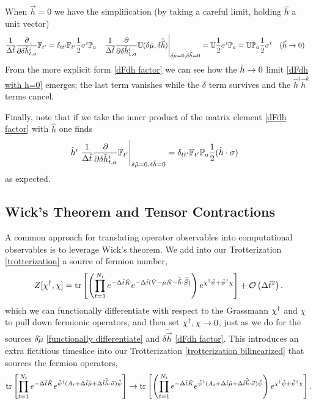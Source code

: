 When $\vec{h}=0$ we have the simplification (by taking a careful limit, holding $\hat{h}$ a unit vector)
\begin{align}
	\frac{1}{\Delta\tilde{t}} \frac{\partial}{\partial \delta\tilde{h}^i_{t,a}} \mathbb{F}_{t'} &= \delta_{tt'} \mathbb{F}_{t'} \frac{1}{2} \sigma^i \mathbb{P}_a
	&
	\left.\frac{1}{\Delta\tilde{t}} \frac{\partial}{\partial \delta\tilde{h}^i_{1,a}} \mathbb{U}(\delta\tilde{\mu}, \delta\tilde{\vec{h}})\right|_{\delta\tilde{\mu}=0, \delta\tilde{\vec{h}}=0}
	&= \mathbb{U} \frac{1}{2} \sigma^i \mathbb{P}_a = \mathbb{U} \mathbb{P}_a \frac{1}{2}\sigma^i 
	&
	(\vec{h} &\rightarrow 0)
	\label{eq:dFdh with h=0}
\end{align}
From the more explicit form \eqref{dFdh factor} we can see how the $\tilde{h}\rightarrow0$ limit \eqref{dFdh with h=0} emerges; the last term vanishes while the $\delta$ term survives and the $\hat{h}^i\hat{h}^k$ terms cancel.

Finally, note that if we take the inner product of the matrix element \eqref{dFdh factor} with $\hat{h}$ one finds
\begin{align}
	\hat{h}^i \left.\frac{1}{\Delta\tilde{t}}\frac{\partial}{\partial \delta \tilde{h}^i_{t,a}} \mathbb{F}_{t'}\right|_{\delta\tilde{\mu} = 0, \delta \tilde{h}=0}
	&= \delta_{tt'} \mathbb{F}_{t'} \mathbb{P}_a \frac{1}{2}(\hat{h}\cdot\sigma)
\end{align}
as expected.

\subsection{Wick's Theorem and Tensor Contractions}\label{sec:contractions}

A common approach for translating operator observables into computational observables is to leverage Wick's theorem.
We add into our Trotterization \eqref{trotterization} a source of fermion number,
\begin{align}
	Z[\chi{}^{\dagger}, \chi] = \text{tr}\left[
		\left(
		\prod_{t=1}^{N_t}
		e^{-\Delta \tilde{t}\tilde{K}}
		e^{-\Delta \tilde{t} (\tilde{V} - \tilde{\mu} \tilde{N} - \tilde{\vec{h}}\cdot \tilde{\vec{S}})}
		\right)
		e^{\chi{}^{\dagger} \tilde{\psi} + \tilde{\psi}{}^{\dagger} \chi}
	\right]
	+ \mathcal{O}\left(\Delta \tilde{t}^2\right).
	\label{eq:fermionic generating function}
\end{align}
which we can functionally differentiate with respect to the Grassmann $\chi{}^{\dagger}$ and $\chi $ to pull down fermionic operators, and then set $\chi{}^{\dagger}, \chi \rightarrow 0$, just as we do for the sources $\delta\tilde{\mu}$ \eqref{functionally differentiate} and $\delta \tilde{\vec{h}}$ \eqref{dFdh factor}.
This introduces an extra fictitious timeslice into our Trotterization \eqref{trotterization bilinearized} that sources the fermion operators,
\begin{align}
	\text{tr}\left[\prod_{t=1}^{N_t} e^{-\Delta \tilde{t}\tilde{K}}  e^{ \tilde{\psi}{}^{\dagger} (A_t + \Delta\tilde{t} \tilde{\mu} + \Delta\tilde{t}\tilde{\vec{h}}\cdot\vec{\sigma}) \tilde{\psi} }\right]
	\rightarrow
	\text{tr}\left[\left(\prod_{t=1}^{N_t} e^{-\Delta \tilde{t}\tilde{K}}  e^{ \tilde{\psi}{}^{\dagger} (A_t + \Delta\tilde{t} \tilde{\mu} + \Delta\tilde{t}\tilde{\vec{h}}\cdot\vec{\sigma}) \tilde{\psi} }\right) e^{\chi{}^{\dagger} \tilde{\psi} + \tilde{\psi}{}^{\dagger} \chi}\right].
\end{align}

